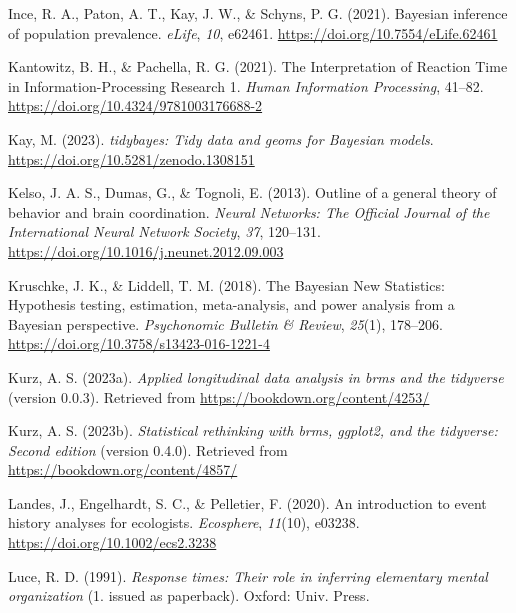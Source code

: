 \documentclass[
  man, donotrepeattitle,floatsintext]{apa6}
\newlength{\cslhangindent}
\newenvironment{CSLReferences}[2] %
 {\begin{list}{}{%
  \setlength{\itemindent}{0pt}
  \setlength{\leftmargin}{0pt}
  \setlength{\parsep}{0pt}
  \ifodd #1
   \setlength{\leftmargin}{\cslhangindent}
   \setlength{\itemindent}{-1\cslhangindent}
  \fi
  \setlength{\itemsep}{#2\baselineskip}}}
 {\end{list}}
\begin{document}
\begin{CSLReferences}{1}{0}
Ince, R. A., Paton, A. T., Kay, J. W., \& Schyns, P. G. (2021). Bayesian inference of population prevalence. \emph{eLife}, \emph{10}, e62461. \url{https://doi.org/10.7554/eLife.62461}

Kantowitz, B. H., \& Pachella, R. G. (2021). The {Interpretation} of {Reaction Time} in {Information-Processing Research} 1. \emph{Human Information Processing}, 41--82. \url{https://doi.org/10.4324/9781003176688-2}

Kay, M. (2023). \emph{{tidybayes}: Tidy data and geoms for {Bayesian} models}. \url{https://doi.org/10.5281/zenodo.1308151}

Kelso, J. A. S., Dumas, G., \& Tognoli, E. (2013). Outline of a general theory of behavior and brain coordination. \emph{Neural Networks: The Official Journal of the International Neural Network Society}, \emph{37}, 120--131. \url{https://doi.org/10.1016/j.neunet.2012.09.003}

Kruschke, J. K., \& Liddell, T. M. (2018). The {Bayesian New Statistics}: {Hypothesis} testing, estimation, meta-analysis, and power analysis from a {Bayesian} perspective. \emph{Psychonomic Bulletin \& Review}, \emph{25}(1), 178--206. \url{https://doi.org/10.3758/s13423-016-1221-4}

Kurz, A. S. (2023a). \emph{Applied longitudinal data analysis in brms and the tidyverse} (version 0.0.3). Retrieved from \url{https://bookdown.org/content/4253/}

Kurz, A. S. (2023b). \emph{Statistical rethinking with brms, ggplot2, and the tidyverse: {Second} edition} (version 0.4.0). Retrieved from \url{https://bookdown.org/content/4857/}

Landes, J., Engelhardt, S. C., \& Pelletier, F. (2020). An introduction to event history analyses for ecologists. \emph{Ecosphere}, \emph{11}(10), e03238. \url{https://doi.org/10.1002/ecs2.3238}

Luce, R. D. (1991). \emph{Response times: Their role in inferring elementary mental organization} (1. issued as paperback). Oxford: Univ. Press.


\end{CSLReferences}
\end{document}
